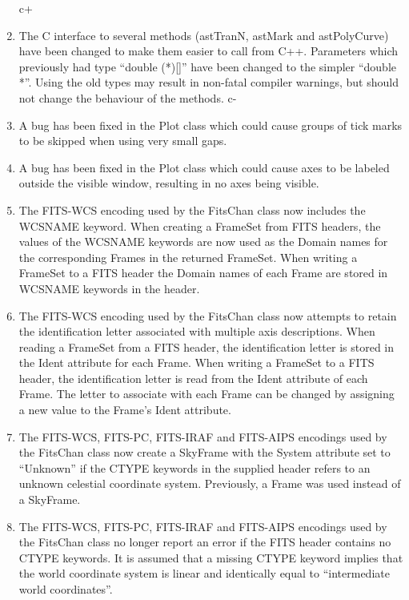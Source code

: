\documentclass[twoside,11pt]{article}
\begin{document}
\begin{enumerate}

c+
\item The C interface to several methods (astTranN, astMark and
astPolyCurve) have been changed to make them easier to call from C++.
Parameters which previously had type ``double (*)[]'' have been changed
to the simpler ``double *''. Using the old types may result in non-fatal
compiler warnings, but should not change the behaviour of the methods.
c-

\item A bug has been fixed in the Plot class which could cause groups
of tick marks to be skipped when using very small gaps.

\item A bug has been fixed in the Plot class which could cause axes to be
labeled outside the visible window, resulting in no axes being visible.

\item The FITS-WCS encoding used by the FitsChan class now includes the
WCSNAME keyword. When creating a FrameSet from FITS headers, the values of
the WCSNAME keywords are now used as the Domain names for the corresponding
Frames in the returned FrameSet. When writing a FrameSet to a FITS header
the Domain names of each Frame are stored in WCSNAME keywords in the
header.

\item The FITS-WCS encoding used by the FitsChan class now attempts to
retain the identification letter associated with multiple axis
descriptions. When reading a FrameSet from a FITS header, the identification
letter is stored in the Ident attribute for each Frame. When writing a
FrameSet to a FITS header, the identification letter is read from the
Ident attribute of each Frame. The letter to associate with each Frame
can be changed by assigning a new value to the Frame's Ident attribute.

\item The FITS-WCS, FITS-PC, FITS-IRAF and FITS-AIPS encodings used by the
FitsChan class now create a SkyFrame with the System attribute set to
``Unknown'' if the CTYPE keywords in the supplied header refers to an
unknown celestial coordinate system. Previously, a Frame was used instead
of a SkyFrame.

\item The FITS-WCS, FITS-PC, FITS-IRAF and FITS-AIPS encodings used by the
FitsChan class no longer report an error if the FITS header contains no
CTYPE keywords. It is assumed that a missing CTYPE keyword implies that
the world coordinate system is linear and identically equal to
``intermediate world coordinates''.


\end{enumerate}
\end{document}
